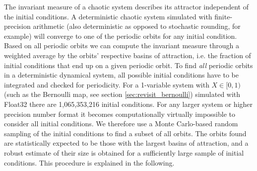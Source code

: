 The invariant measure of a chaotic system describes its attractor independent of the initial conditions. A deterministic chaotic
system simulated with finite-precision arithmetic (also deterministic as opposed to stochastic rounding, for example) will converge
to one of the periodic orbits for any initial condition. Based on all periodic orbits we can compute the invariant measure through
a weighted average by the orbits’ respective basins of attraction, i.e. the fraction of initial conditions that end up on a given
periodic orbit. To find \emph{all} periodic orbits in a deterministic dynamical system, all possible initial conditions have to be
integrated and checked for periodicity. For a 1-variable system with $X \in [0,1)$ (such as the Bernoulli map, see section
\ref{sec:revisit_bernoulli}) simulated with Float32 there are 1,065,353,216 initial conditions. For any larger system or
higher precision number format it becomes computationally virtually impossible to consider all initial conditions. We therefore
use a Monte Carlo-based random sampling of the initial conditions to find a subset of all orbits. The orbits found are statistically
expected to be those with the largest basins of attraction, and a robust estimate of their size is obtained for a sufficiently large
sample of initial conditions. This procedure is explained in the following.

